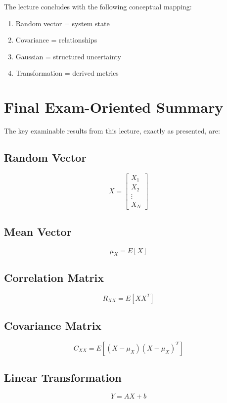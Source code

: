 \documentclass[12pt]{article}
\begin{document}
The lecture concludes with the following conceptual mapping:

\begin{enumerate}
    \item Random vector = system state
    \item Covariance = relationships
    \item Gaussian = structured uncertainty
    \item Transformation = derived metrics
\end{enumerate}

\section{Final Exam-Oriented Summary}

The key examinable results from this lecture, exactly as presented, are:

\subsection{Random Vector}

\[
X =
\begin{bmatrix}
X_1\\
X_2\\
\vdots\\
X_N
\end{bmatrix}
\]

\subsection{Mean Vector}

\[
\mu_X = E[X]
\]

\subsection{Correlation Matrix}

\[
R_{XX} = E[XX^T]
\]

\subsection{Covariance Matrix}

\[
C_{XX} = E[(X-\mu_X)(X-\mu_X)^T]
\]

\subsection{Linear Transformation}

\[
Y = AX + b
\]
\end{document}
